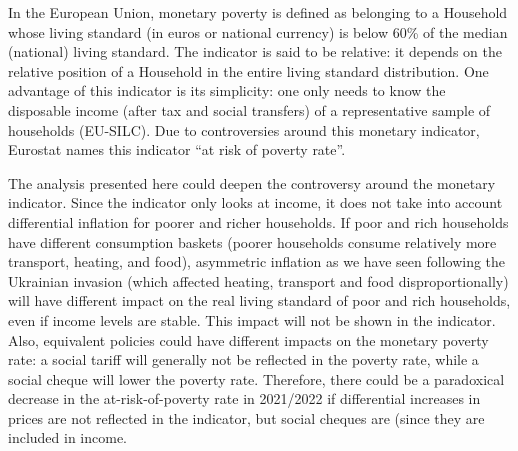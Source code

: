 \documentclass[
  9pt,
  a4paper,
  DIV=11,
  numbers=noendperiod,
  oneside]{scrartcl}
\begin{document}
\begin{tcolorbox}[enhanced jigsaw, arc=.35mm, leftrule=.75mm, left=2mm, bottomrule=.15mm, rightrule=.15mm, colframe=quarto-callout-note-color-frame, toprule=.15mm, colback=white, opacityback=0, breakable]
In the European Union, monetary poverty is defined as belonging to a
Household whose living standard (in euros or national currency) is below
60\% of the median (national) living standard. The indicator is said to
be relative: it depends on the relative position of a Household in the
entire living standard distribution. One advantage of this indicator is
its simplicity: one only needs to know the disposable income (after tax
and social transfers) of a representative sample of households
(EU-SILC). Due to controversies around this monetary indicator, Eurostat
names this indicator ``at risk of poverty rate''.

The analysis presented here could deepen the controversy around the
monetary indicator. Since the indicator only looks at income, it does
not take into account differential inflation for poorer and richer
households. If poor and rich households have different consumption
baskets (poorer households consume relatively more transport, heating,
and food), asymmetric inflation as we have seen following the Ukrainian
invasion (which affected heating, transport and food disproportionally)
will have different impact on the real living standard of poor and rich
households, even if income levels are stable. This impact will not be
shown in the indicator. Also, equivalent policies could have different
impacts on the monetary poverty rate: a social tariff will generally not
be reflected in the poverty rate, while a social cheque will lower the
poverty rate. Therefore, there could be a paradoxical decrease in the
at-risk-of-poverty rate in 2021/2022 if differential increases in prices
are not reflected in the indicator, but social cheques are (since they
are included in income.


\end{tcolorbox}
\end{document}
